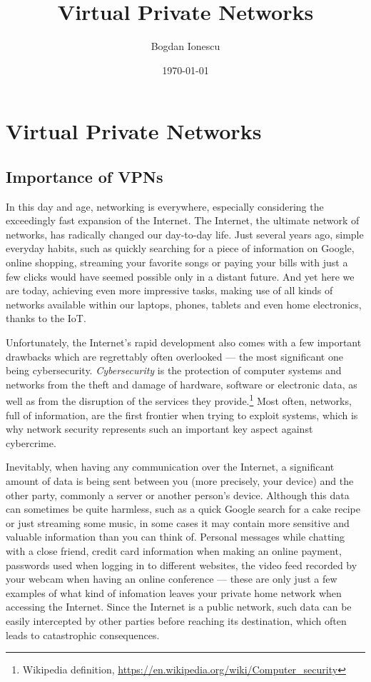 \documentclass[a4paper,12pt]{report}
\begin{document}
	\title{Virtual Private Networks}
	\author{Bogdan Ionescu}
	\date{\today}
	\maketitle
	\tableofcontents
	
	\chapter{Virtual Private Networks}
	\section{Importance of VPNs}
		In this day and age, networking is everywhere, especially considering the exceedingly fast expansion of the Internet. The Internet, the ultimate network of networks, has radically changed our day-to-day life. Just several years ago, simple everyday habits, such as quickly searching for a piece of information on Google, online shopping, streaming your favorite songs or paying your bills with just a few clicks would have seemed possible only in a distant future. And yet here we are today, achieving even more impressive tasks, making use of all kinds of networks available within our laptops, phones, tablets and even home electronics, thanks to the IoT.
		
		Unfortunately, the Internet's rapid development also comes with a few important drawbacks which are regrettably often overlooked --- the most significant one being cybersecurity. \textit{Cybersecurity} is the protection of computer systems and networks from the theft and damage of hardware, software or electronic data, as well as from the disruption of the services they provide.\footnote{Wikipedia definition, \url{https://en.wikipedia.org/wiki/Computer_security}} Most often, networks, full of information, are the first frontier when trying to exploit systems,  which is why network security represents such an important key aspect against cybercrime.
		
		Inevitably, when having any communication over the Internet, a significant amount of data is being sent between you (more precisely, your device) and the other party, commonly a server or another person's device. Although this data can sometimes be quite harmless, such as a quick Google search for a cake recipe or just streaming some music, in some cases it may contain more sensitive and valuable information than you can think of. Personal messages while chatting with a close friend, credit card information when making an online payment, passwords used when logging in to different websites, the video feed recorded by your webcam when having an online conference --- these are only just a few examples of what kind of infomation leaves your private home network when accessing the Internet. Since the Internet is a public network, such data can be easily intercepted by other parties before reaching its destination, which often leads to catastrophic consequences.
		
\end{document}
